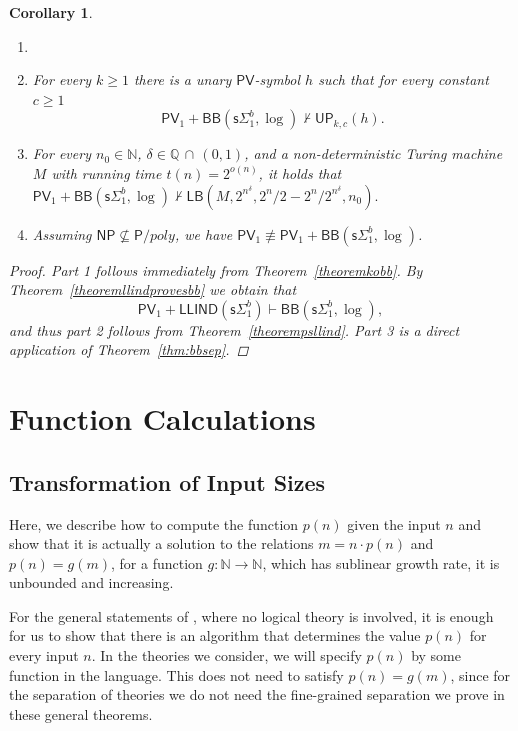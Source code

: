 \documentclass[11pt]{article}
\newcommand{\N}{\mathbb{N}}
\renewcommand{\P}{\mathsf{P}}
\newcommand{\NP}{\mathsf{NP}}
\newcommand{\PV}{\mathsf{PV}}
\newcommand{\UP}{\mathsf{UP}}
\newtheorem{corollary}[theorem]{Corollary}
\theoremstyle{definition}
\theoremstyle{definition}
\theoremstyle{remark}
\begin{document}
\begin{corollary}\label{corollarybothunprovabilities}
    \begin{enumerate}
        \item[]
        \item For every $k\geq 1$ there is a unary $\PV$-symbol $h$ such that for every constant $c\geq 1$
            \[\PV_1+\mathsf{BB}(\mathsf{s}\Sigma^b_1,\log)\nvdash \UP_{k,c}(h).\]
        \item For every $n_0\in \N$, $\delta\in \mathbb{Q} \,\cap\, (0,1)$, and a non-deterministic Turing machine $M$ with running time $t(n)=2^{o(n)}$, it holds that
        $
        \PV_1+\mathsf{BB}(\mathsf{s}\Sigma^b_1,\log)\not\vdash \mathsf{LB}(M,2^{n^\delta},2^n/2-2^n/2^{n^\delta},n_0).
        $
        \item Assuming $\NP\not\subseteq \P/poly$, we have $\PV_1\not\equiv \PV_1+\mathsf{BB}(\mathsf{s}\Sigma^b_1,\log)$.
    \end{enumerate}
    \begin{proof}
        Part 1 follows immediately from Theorem~\ref{theoremkobb}. By Theorem~\ref{theoremllindprovesbb} we obtain that \[\PV_1+\mathsf{LLIND}(\mathsf{s}\Sigma^b_1) \vdash\mathsf{BB}(\mathsf{s}\Sigma^b_1,\log),\]
        and thus part 2 follows from Theorem~\ref{theorempsllind}. Part 3 is a direct application of Theorem~\ref{thm:bbsep}.
    \end{proof}
\end{corollary}





\appendix
\section{Function Calculations}\label{sec:appendix}

\subsection{Transformation of Input Sizes}\label{sec:input}

Here, we describe how to compute the function $p(n)$ given the input $n$ and show that it is actually a solution to the relations $m=n\cdot p(n)$ and $p(n)=g(m)$, for a function $g: \N\to\N$, which has sublinear growth rate, it is unbounded and increasing. 

For the general statements of , where no logical theory is involved, it is enough for us to show that there is an algorithm that determines the value $p(n)$ for every input $n$. In the theories we consider, we will specify $p(n)$ by some function in the language. This does not need to satisfy $p(n)=g(m)$, since for the separation of theories we do not need the fine-grained separation we prove in these general theorems.
\end{document}

